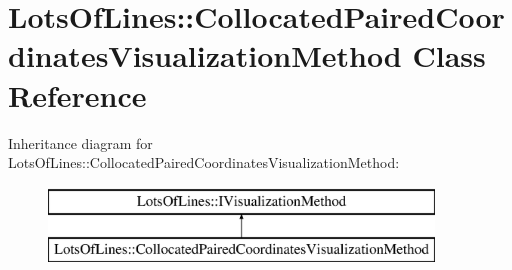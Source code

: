 \hypertarget{class_lots_of_lines_1_1_collocated_paired_coordinates_visualization_method}{}\section{Lots\+Of\+Lines\+:\+:Collocated\+Paired\+Coordinates\+Visualization\+Method Class Reference}
\label{class_lots_of_lines_1_1_collocated_paired_coordinates_visualization_method}
Inheritance diagram for Lots\+Of\+Lines\+:\+:Collocated\+Paired\+Coordinates\+Visualization\+Method\+:\begin{figure}[H]
\begin{center}
\leavevmode
\includegraphics[height=2.000000cm]{class_lots_of_lines_1_1_collocated_paired_coordinates_visualization_method}
\end{center}
\end{figure}
